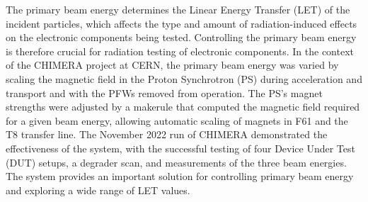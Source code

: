 \documentclass{cernatsnote}
\begin{document}
 The primary beam energy determines the Linear Energy Transfer (LET) of the incident particles, which affects the type and amount of radiation-induced effects on the electronic components being tested. Controlling the primary beam energy is therefore crucial for radiation testing of electronic components. In the context of the CHIMERA project at CERN, the primary beam energy was varied by scaling the magnetic field in the Proton Synchrotron (PS) during acceleration and transport and with the PFWs removed from operation. The PS's magnet strengths were adjusted by a makerule that computed the magnetic field required for a given beam energy, allowing automatic scaling of magnets in F61 and the T8 transfer line. The November 2022 run of CHIMERA demonstrated the effectiveness of the system, with the successful testing of four Device Under Test (DUT) setups, a degrader scan, and measurements of the three beam energies. The system provides an important solution for controlling primary beam energy and exploring a wide range of LET values.



\end{document}
